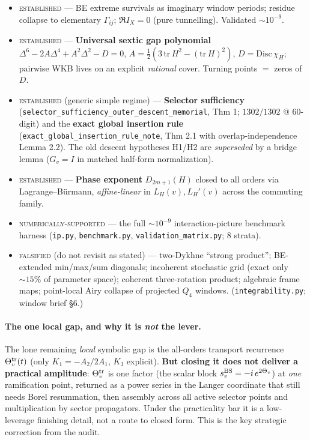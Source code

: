 \documentclass[11pt]{article}
\newcommand{\Gam}{\Gamma}
\begin{document}
\begin{itemize}[nosep,leftmargin=1.4em]
\item \textsc{established} --- BE extreme survivals as imaginary window periods; residue collapse
  to elementary $\Gam_{ij}$; $\Re I_X=0$ (pure tunnelling). Validated $\sim10^{-9}$.
\item \textsc{established} --- \textbf{Universal sextic gap polynomial}
  $\Delta^6-2A\Delta^4+A^2\Delta^2-D=0$, $A=\tfrac12(3\,\mathrm{tr}\,H^2-(\mathrm{tr}\,H)^2)$,
  $D=\mathrm{Disc}\,\chi_H$; pairwise WKB lives on an explicit \emph{rational} cover. Turning
  points $=$ zeros of $D$.
\item \textsc{established} (generic simple regime) --- \textbf{Selector sufficiency}
  (\texttt{selector\_sufficiency\_outer\_descent\_memorial}, Thm 1; $1302/1302$ @ 60-digit) and
  the \textbf{exact global insertion rule} (\texttt{exact\_global\_insertion\_rule\_note}, Thm 2.1
  with overlap-independence Lemma 2.2). The old descent hypotheses H1/H2 are \emph{superseded} by
  a bridge lemma ($G_v=I$ in matched half-form normalization).
\item \textsc{established} --- \textbf{Phase exponent} $D_{2m+1}(H)$ closed to all orders via
  Lagrange--B\"urmann, \emph{affine-linear} in $L_H(v),L_H'(v)$ across the commuting family.
\item \textsc{numerically-supported} --- the full $\sim10^{-9}$ interaction-picture benchmark
  harness (\texttt{ip.py}, \texttt{benchmark.py}, \texttt{validation\_matrix.py}; 8 strata).
\item \textsc{falsified} (do not revisit as stated) --- two-Dykhne ``strong product'';
  BE-extended min/max/sum diagonals; incoherent stochastic grid (exact only $\sim15\%$ of
  parameter space); coherent three-rotation product; algebraic frame maps; point-local Airy
  collapse of projected $Q_4$ windows. (\texttt{integrability.py}; window brief \S6.)
\end{itemize}

\paragraph{The one local gap, and why it is \emph{not} the lever.}
The lone remaining \emph{local} symbolic gap is the all-orders transport recurrence
$\Theta^{\rm tr}_v(t)$ (only $K_1=-A_2/2A_1$, $K_3$ explicit). \textbf{But closing it does not
deliver a practical amplitude}: $\Theta^{\rm tr}_v$ is one factor (the scalar block
$s^{\rm BS}_v=-i\,e^{2\Theta_v}$) at \emph{one} ramification point, returned as a power series in
the Langer coordinate that still needs Borel resummation, then assembly across all active selector
points and multiplication by sector propagators. Under the practicality bar it is a low-leverage
finishing detail, not a route to closed form. This is the key strategic correction from the audit.
\end{document}
